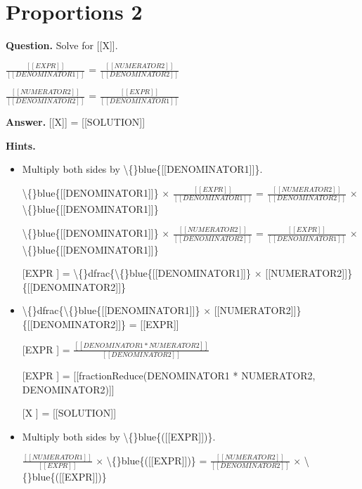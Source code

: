 \documentclass{article}
\begin{document}
\section*{Proportions 2}
\textbf{Question.} Solve for [[X]].
                    
                        $\frac{[[EXPR]]}{[[DENOMINATOR1]]}$ = $\frac{[[NUMERATOR2]]}{[[DENOMINATOR2]]}$
                    
                    
                        $\frac{[[NUMERATOR2]]}{[[DENOMINATOR2]]}$ = $\frac{[[EXPR]]}{[[DENOMINATOR1]]}$

\textbf{Answer.} [[X]] =
                        [[SOLUTION]]

\textbf{Hints.}
\begin{itemize}
  \item Multiply both sides by \textbackslash\{\}blue\{[[DENOMINATOR1]]\}.
                        
                            \textbackslash\{\}blue\{[[DENOMINATOR1]]\} $\times$ $\frac{[[EXPR]]}{[[DENOMINATOR1]]}$ = 
                            $\frac{[[NUMERATOR2]]}{[[DENOMINATOR2]]}$ $\times$ \textbackslash\{\}blue\{[[DENOMINATOR1]]\}
                        
                        
                            \textbackslash\{\}blue\{[[DENOMINATOR1]]\} $\times$ $\frac{[[NUMERATOR2]]}{[[DENOMINATOR2]]}$ =
                            $\frac{[[EXPR]]}{[[DENOMINATOR1]]}$ $\times$ \textbackslash\{\}blue\{[[DENOMINATOR1]]\}
  \item [[EXPR]] = \textbackslash\{\}dfrac\{\textbackslash\{\}blue\{[[DENOMINATOR1]]\} $\times$ [[NUMERATOR2]]\}\{[[DENOMINATOR2]]\}
  \item \textbackslash\{\}dfrac\{\textbackslash\{\}blue\{[[DENOMINATOR1]]\} $\times$ [[NUMERATOR2]]\}\{[[DENOMINATOR2]]\} = [[EXPR]]
  \item [[EXPR]] = $\frac{[[DENOMINATOR1 * NUMERATOR2]]}{[[DENOMINATOR2]]}$
  \item [[EXPR]] = [[fractionReduce(DENOMINATOR1 * NUMERATOR2, DENOMINATOR2)]]
  \item [[X]] = [[SOLUTION]]
  \item Multiply both sides by \textbackslash\{\}blue\{([[EXPR]])\}.
                            
                                $\frac{[[NUMERATOR1]]}{[[EXPR]]}$ $\times$ \textbackslash\{\}blue\{([[EXPR]])\} = 
                                $\frac{[[NUMERATOR2]]}{[[DENOMINATOR2]]}$ $\times$ \textbackslash\{\}blue\{([[EXPR]])\}
                            

\end{itemize}
\end{document}
